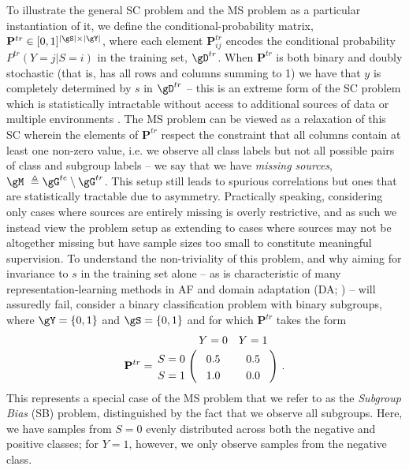 To illustrate the general \ac{SC} problem and the \ac{MS} problem as a particular instantiation of
it, we define the conditional-probability matrix, \( \mathbf{P}^{tr} \in [0, 1]^{|\gS| \times
|\gY|} \), where each element \( \mathbf{P}^{tr}_{ij} \) encodes the conditional probability \(
P^{tr}(Y=j|S=i) \) in the training set, \( \gD^{tr} \). 
%
When \( \mathbf{P}^{tr} \) is both binary and doubly stochastic (that is, has all rows and columns
summing to 1) we have that \(y\) is completely determined by \(s\) in \( \gD^{tr} \) -- this is an
extreme form of the \ac{SC} problem which is statistically intractable without access to additional
sources of data \citep{KehBarThoQua20} or multiple environments \citep{arjovsky2019invariant}. 
%
The MS problem can be viewed as a relaxation of this \ac{SC} wherein the elements of \( \mathbf{P}^{tr}
\) respect the constraint that all columns contain at least one non-zero value, i.e. we observe all
class labels but not all possible pairs of class and subgroup labels -- we say that we have
\emph{missing sources}, \(\gM\ \triangleq \gG^{te} \setminus \gG^{tr}\). 
%
This setup still leads to spurious correlations but ones that are statistically tractable due to
asymmetry.
%
Practically speaking, considering only cases where sources are entirely missing is overly
restrictive, and as such we instead view the problem setup as extending to cases where sources may
not be altogether missing but have sample sizes too small to constitute meaningful supervision. 
%
To understand the non-triviality of this problem, and why aiming for invariance to \(s\) in the
training set alone -- as is characteristic of many representation-learning methods in \ac{AF}
\citep{edwards2015censoring, madras2018learning, quadrianto2019discovering}  and domain adaptation
(\ac{DA}; \citep{ganin2016domain, zhao2018adversarial, saito2018maximum, lee2019sliced}) -- will
assuredly fail, consider a binary classification problem with binary subgroups, where \(\gY = \{ 0,
1 \}\) and \( \gS = \{ 0, 1 \}\) and for which \( \mathbf{P}^{tr} \) takes the form
%
\begin{align}\label{ms_example}
  \mathbf{P}^{tr} = \bordermatrix{
  & Y=0 & Y=1 \cr
  S=0 & 0.5 & 0.5 \cr
  S=1 & 1.0 & 0.0}~.
\end{align}
%
This represents a special case of the MS problem that we refer to as the \emph{Subgroup Bias} (SB)
problem, distinguished by the fact that we observe all subgroups. 
%
Here, we have samples from $S=0$ evenly distributed across both the negative and positive classes;
for $Y=1$, however, we only observe samples from the negative class. 
